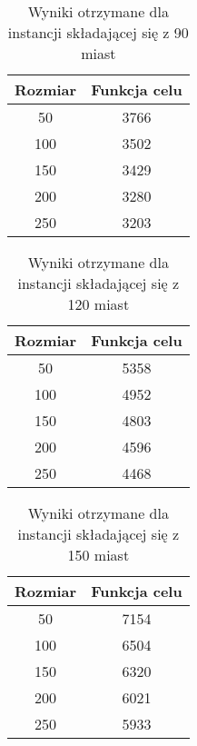       \begin{table}[!ht]
        \centering
        \begin{tabular}{|c | c |}
        \hline
            Rozmiar & Funkcja celu  \\ \hline
            50 & 3766\\ \hline
            100 & 3502\\ \hline
            150 & 3429\\ \hline
            200 & 3280\\ \hline
            250 & 3203\\  \hline
        \end{tabular}
        \caption{Wyniki otrzymane dla instancji składającej się z 90 miast}
      \end{table}
      \begin{table}[!ht]
        \centering
        \begin{tabular}{|c | c |}
        \hline
            Rozmiar & Funkcja celu  \\ \hline
            50 & 5358\\ \hline
            100 & 4952\\ \hline
            150 & 4803\\ \hline
            200 & 4596\\ \hline
            250 & 4468\\  \hline
        \end{tabular}
        \caption{Wyniki otrzymane dla instancji składającej się z 120 miast}
      \end{table}
      \begin{table}[!ht]
        \centering
        \begin{tabular}{|c | c |}
        \hline
            Rozmiar & Funkcja celu  \\ \hline
            50 & 7154\\ \hline
            100 & 6504\\ \hline
            150 & 6320\\ \hline
            200 & 6021\\ \hline
            250 & 5933\\  \hline
        \end{tabular}
        \caption{Wyniki otrzymane dla instancji składającej się z 150 miast}
      \end{table}
